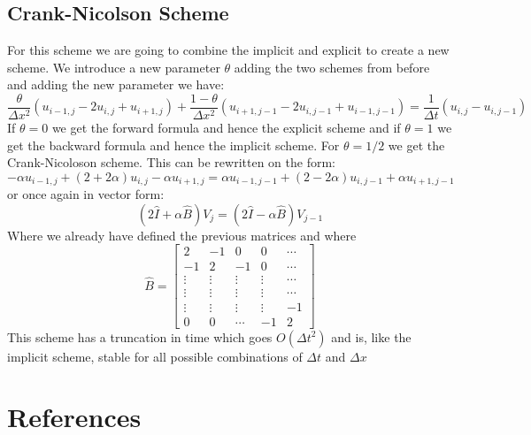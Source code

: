 \documentclass{article}
\begin{document}
\subsection{Crank-Nicolson Scheme}
For this scheme we are going to combine the implicit and explicit to create a new scheme. We introduce a new parameter $\theta$ adding the two schemes from before and adding the new parameter we have:
$$\frac{\theta}{\Delta x^2}(u_{i-1,j} - 2u_{i,j} +u_{i+1,j}) + \frac{1-\theta}{\Delta x^2}(u_{i+1,j-1} - 2u_{i,j-1} + u_{i-1,j-1}) = \frac{1}{\Delta t}(u_{i,j} - u_{i,j-1})$$
If $\theta = 0$ we get the forward formula and hence the explicit scheme and if $\theta = 1$ we get the backward formula and hence the implicit scheme. For $\theta = 1/2$ we get the Crank-Nicoloson scheme.
This can be rewritten on the form:
$$ -\alpha u_{i-1,j} + (2 +2\alpha)u_{i,j} - \alpha u_{i+1,j}= \alpha u_{i-1,j-1} + (2 -2\alpha)u_{i,j-1} + \alpha u_{i+1,j-1}$$
or once again in vector form:
$$(2\hat{I} + \alpha\hat{B})V_j = (2\hat{I} - \alpha\hat{B})V_{j-1}$$
Where we already have defined the previous matrices and where 
$$\hat{B} = \begin{bmatrix}
       2         & -1        & 0           & 0        & \cdots  \\[0.3em]
       -1        & 2         & -1 	       & 0        & \cdots  \\[0.3em]
       \vdots 	 & \vdots    & \vdots      & \vdots   & \cdots  \\[0.3em]
       \vdots    & \vdots    & \vdots      & \vdots   & \cdots  \\[0.3em]
       \vdots    & \vdots    & \vdots      & \vdots   & -1 \\[0.3em]
       0         & 0         & \cdots      & -1       & 2
     \end{bmatrix} $$
This scheme has a truncation in time which goes $O(\Delta t^2)$ and is, like the implicit scheme, stable for all possible combinations of $\Delta t$ and $\Delta x$
\section{References}
\end{document}
